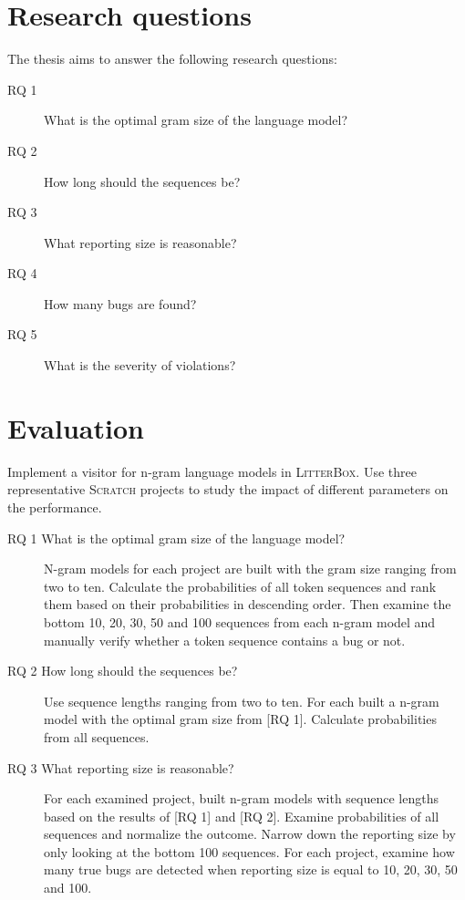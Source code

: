 \documentclass[
    numbers=noenddot,
    parskip=half-,
    fontsize=12pt,
    paper=a4,
    oneside,
    titlepage,
    bibliography=totoc,
    chapterprefix=false,
]{scrbook}
\newcommand{\litterbox}{\textsc{LitterBox}}
\newcommand{\scratch}{\textsc{Scratch}}
\begin{document}
    \chapter{Research questions}\label{ch:research-questions}
    The thesis aims to answer the following research questions:

    \begin{description}
        \item[RQ 1] What is the optimal gram size of the language model?
        \item[RQ 2] How long should the sequences be?
        \item[RQ 3] What reporting size is reasonable?
        \item[RQ 4] How many bugs are found?
        \item[RQ 5] What is the severity of violations?
    \end{description}


    \chapter{Evaluation}\label{ch:evaluation}
    
    Implement a visitor for n-gram language models in \litterbox{}. Use three representative \scratch{} projects to study the impact of different parameters on the performance.  
    
    \begin{description}
        \item[RQ 1 What is the optimal gram size of the language model?] N-gram models for each project are built with the gram size ranging from two to ten. Calculate the probabilities of all token sequences and rank them based on their probabilities in descending order. Then examine the bottom 10, 20, 30, 50 and 100 sequences from each n-gram model and manually verify whether a token sequence contains a bug or not.
        \item[RQ 2 How long should the sequences be?]
        Use sequence lengths ranging from two to ten. For each built a n-gram model with the optimal gram size from [RQ 1]. Calculate probabilities from all sequences.
        \item[RQ 3 What reporting size is reasonable?]
        For each examined project, built n-gram models with sequence lengths based on the results of [RQ 1] and [RQ 2]. Examine probabilities of all sequences and normalize the outcome. Narrow down the reporting size by only looking at the bottom 100 sequences. For each project, examine how many true bugs are detected when reporting size is equal to 10, 20, 30, 50 and 100.
    \end{description}
\end{document}

